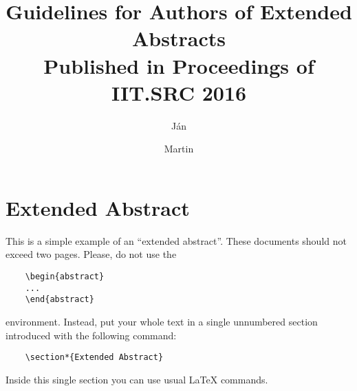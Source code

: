 \documentclass{iitsrc}
\title{Guidelines for Authors of Extended Abstracts\\Published in Proceedings of IIT.SRC 2016}
\author{Ján}{Novák}
\author{Martin}{Kováč}
\begin{document}
\section*{Extended Abstract}

This is a simple example of an ``extended abstract''. These documents should not exceed two pages. Please, do not use the
\begin{verbatim}
    \begin{abstract}
    ...
    \end{abstract}
\end{verbatim}
environment. Instead, put your whole text in a single unnumbered section introduced with the following command:
\begin{verbatim}
    \section*{Extended Abstract}
\end{verbatim}
Inside this single section you can use usual \LaTeX{} commands.

\nocite{lamport:latex}




\end{document}
